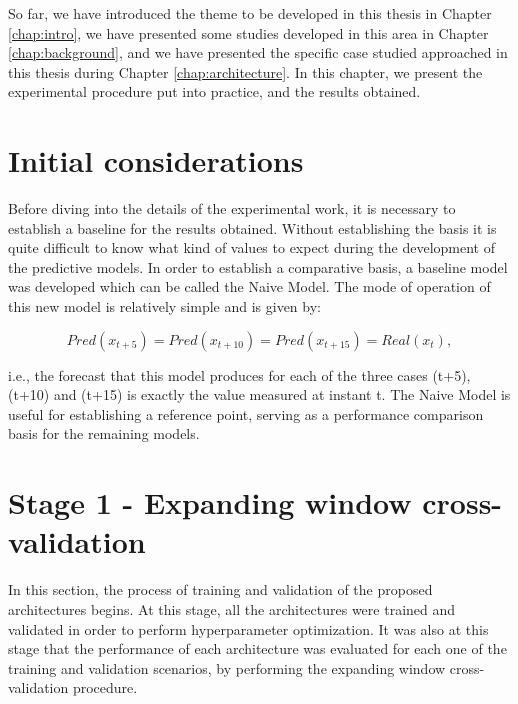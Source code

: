 \cleardoublepage
\label{chap:results}

So far, we have introduced the theme to be developed in this thesis in Chapter \ref{chap:intro}, we have presented some studies developed in this area in Chapter \ref{chap:background}, and we have presented the specific case studied approached in this thesis during Chapter \ref{chap:architecture}. In this chapter, we present the experimental procedure put into practice, and the results obtained.



\section{Initial considerations}

Before diving into the details of the experimental work, it is necessary to establish a baseline for the results obtained. Without establishing the basis it is quite difficult to know what kind of values to expect during the development of the predictive models. In order to establish a comparative basis, a baseline model was developed which can be called the Naive Model. The mode of operation of this new model is relatively simple and is given by:

\begin{equation}
   Pred(x_{t+5}) = Pred(x_{t+10}) = Pred(x_{t+15}) = Real(x_{t}),
   \label{naive}
\end{equation}

i.e., the forecast that this model produces for each of the three cases (t+5), (t+10) and (t+15) is exactly the value measured at instant t. The Naive Model is useful for establishing a reference point, serving as a performance comparison basis for the remaining models.

\section{Stage 1 - Expanding window cross-validation}\label{chap3:section:stage_1}

In this section, the process of training and validation of the proposed architectures begins. At this stage, all the architectures were trained and validated in order to perform hyperparameter optimization. It was also at this stage that the performance of each architecture was evaluated for each one of the training and validation scenarios, by performing the expanding window cross-validation procedure. 

